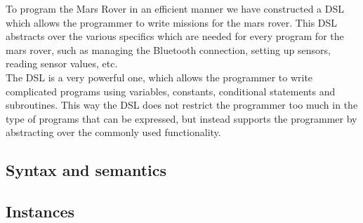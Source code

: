 To program the Mars Rover in an efficient manner we have constructed a DSL which
allows the programmer to write missions for the mars rover. This DSL abstracts
over the various specifics which are needed for every program for the mars 
rover, such as managing the Bluetooth connection, setting up sensors, reading
sensor values, etc. \\  

The DSL is a very powerful one, which allows the programmer to write complicated
programs using variables, constants, conditional statements and subroutines. 
This way the DSL does not restrict the programmer too much in the type of 
programs that can be expressed, but instead supports the programmer by 
abstracting over the commonly used functionality. \\

\subsection{Syntax and semantics}


\subsection{Instances}
